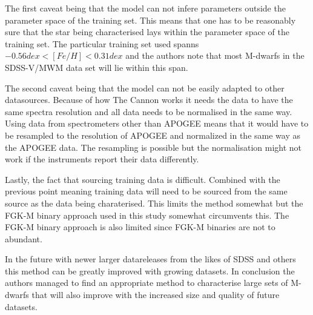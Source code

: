 \documentclass[a4paper]{article}
\begin{document}
The first caveat being that the model can not infere parameters outside the parameter space of the training set. This means that one has to be reasonably sure that the star being characterised lays within the parameter space of the training set. The particular training set used spanns $-0.56 dex < [Fe/H] < 0.31 dex$ and the authors note that most M-dwarfs in the SDSS-V/MWM data set will lie within this span. 

The second caveat being that the model can not be easily adapted to other datasources. Because of how The Cannon works it needs the data to have the same spectra resolution and all data needs to be normalised in the same way. Using data from spectrometers other than APOGEE means that it would have to be resampled to the resolution of APOGEE and normalized in the same way as the APOGEE data. The resampling is possible but the normalisation might not work if the instruments report their data differently. 

Lastly, the fact that sourcing training data is difficult. Combined with the previous point meaning training data will need to be sourced from the same source as the data being charaterised. This limits the method somewhat but the FGK-M binary approach used in this study somewhat circumvents this. The FGK-M binary approach is also limited since FGK-M binaries are not to abundant.

In the future with newer larger datareleases from the likes of SDSS and others this method can be greatly improved with growing datasets. In conclusion the authors managed to find an appropriate method to characterise large sets of M-dwarfs that will also improve with the increased size and quality of future datasets.  

\pagebreak

\end{document}
